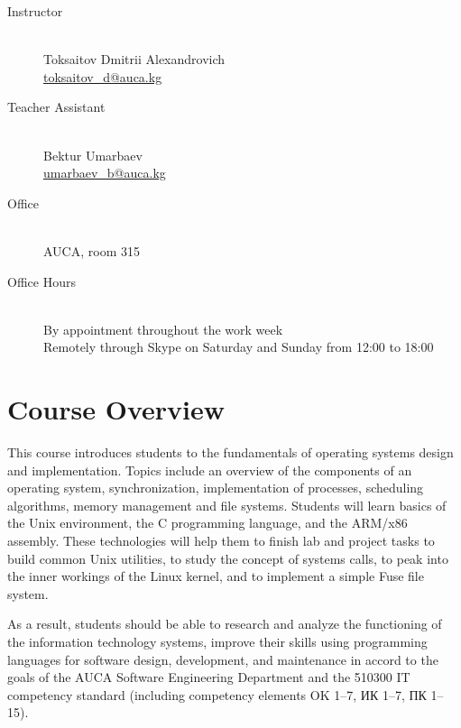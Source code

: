 \documentclass[12pt,a4paper,oneside]{article}
\begin{document}
        \begin{description}
            \item[Instructor]\hfill\\
                Toksaitov Dmitrii Alexandrovich\\
                \href{mailto:toksaitov_d@auca.kg}{toksaitov\_d@auca.kg}
            \item[Teacher Assistant]\hfill\\
                Bektur Umarbaev\\
                \href{mailto:umarbaev_b@auca.kg}{umarbaev\_b@auca.kg}
            \item[Office]\hfill\\
                AUCA, room 315
            \item[Office Hours]\hfill\\
                By appointment throughout the work week\\
                Remotely through Skype on Saturday and Sunday from 12:00 to
                18:00
        \end{description}

    \section{Course Overview}

        This course introduces students to the fundamentals of operating systems
        design and implementation. Topics include an overview of the components
        of an operating system, synchronization, implementation of processes,
        scheduling algorithms, memory management and file systems. Students will
        learn basics of the Unix environment, the C programming language, and
        the ARM/x86 assembly. These technologies will help them to finish lab
        and project tasks to build common Unix utilities, to study the concept
        of systems calls, to peak into the inner workings of the Linux kernel,
        and to implement a simple Fuse file system.

        As a result, students should be able to research and analyze the
        functioning of the information technology systems, improve their skills
        using programming languages for software design, development, and
        maintenance in accord to the goals of the AUCA Software Engineering
        Department and the 510300 IT competency standard (including competency
        elements OK 1–7, ИК 1–7, ПК 1–15).
\end{document}
